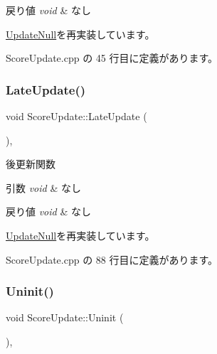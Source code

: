 \begin{DoxyRetVals}{戻り値}
{\em void} & なし \\
\hline
\end{DoxyRetVals}


\mbox{\hyperlink{class_update_null_aaa8f5fe1f03e252ad75eb8c888a5bf46}{Update\+Null}}を再実装しています。



 Score\+Update.\+cpp の 45 行目に定義があります。

\mbox{\label{class_score_update_adc9a48f54828e49c072c298777935893}} 
\subsubsection{\texorpdfstring{Late\+Update()}{LateUpdate()}}
{\footnotesize\ttfamily void Score\+Update\+::\+Late\+Update (\begin{DoxyParamCaption}{ }\end{DoxyParamCaption})\hspace{0.3cm}{\ttfamily [override]}, {\ttfamily [virtual]}}



後更新関数 


\begin{DoxyParams}{引数}
{\em void} & なし \\
\hline
\end{DoxyParams}

\begin{DoxyRetVals}{戻り値}
{\em void} & なし \\
\hline
\end{DoxyRetVals}


\mbox{\hyperlink{class_update_null_a8d335882bce4eab384d44c4bae474ee5}{Update\+Null}}を再実装しています。



 Score\+Update.\+cpp の 88 行目に定義があります。

\mbox{\label{class_score_update_a701d9c84c3ef92b1c54f33b37e23605f}} 
\subsubsection{\texorpdfstring{Uninit()}{Uninit()}}
{\footnotesize\ttfamily void Score\+Update\+::\+Uninit (\begin{DoxyParamCaption}{ }\end{DoxyParamCaption})\hspace{0.3cm}{\ttfamily [override]}, {\ttfamily [virtual]}}



